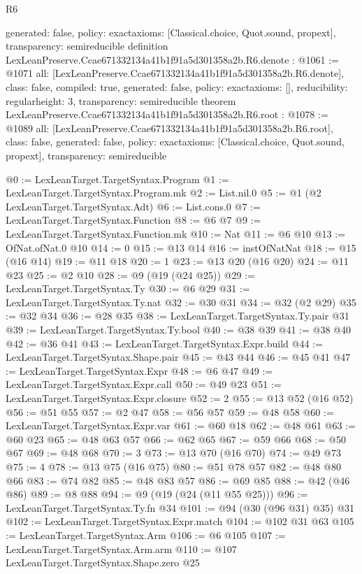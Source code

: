 \begin{lexlean}{R6}
\begin{coremodule}
{  generated: false,
  policy: exact{axioms: [Classical.choice, Quot.sound, propext]},
  transparency: semireducible
}
definition LexLeanPreserve.Ccae671332134a41b1f91a5d301358a2b.R6.denote : @1061 := @1071 {
  all: [LexLeanPreserve.Ccae671332134a41b1f91a5d301358a2b.R6.denote],
  class: false,
  compiled: true,
  generated: false,
  policy: exact{axioms: []},
  reducibility: regular{height: 3},
  transparency: semireducible
}
theorem LexLeanPreserve.Ccae671332134a41b1f91a5d301358a2b.R6.root : @1078 := @1089 {
  all: [LexLeanPreserve.Ccae671332134a41b1f91a5d301358a2b.R6.root],
  class: false,
  generated: false,
  policy: exact{axioms: [Classical.choice, Quot.sound, propext]},
  transparency: semireducible
}

@0 := LexLeanTarget.TargetSyntax.Program
@1 := LexLeanTarget.TargetSyntax.Program.mk
@2 := List.nil.{0}
@5 := @1 (@2 LexLeanTarget.TargetSyntax.Adt)
@6 := List.cons.{0}
@7 := LexLeanTarget.TargetSyntax.Function
@8 := @6 @7
@9 := LexLeanTarget.TargetSyntax.Function.mk
@10 := Nat
@11 := @6 @10
@13 := OfNat.ofNat.{0} @10
@14 := 0
@15 := @13 @14
@16 := instOfNatNat
@18 := @15 (@16 @14)
@19 := @11 @18
@20 := 1
@23 := @13 @20 (@16 @20)
@24 := @11 @23
@25 := @2 @10
@28 := @9 (@19 (@24 @25))
@29 := LexLeanTarget.TargetSyntax.Ty
@30 := @6 @29
@31 := LexLeanTarget.TargetSyntax.Ty.nat
@32 := @30 @31
@34 := @32 (@2 @29)
@35 := @32 @34
@36 := @28 @35
@38 := LexLeanTarget.TargetSyntax.Ty.pair @31
@39 := LexLeanTarget.TargetSyntax.Ty.bool
@40 := @38 @39
@41 := @38 @40
@42 := @36 @41
@43 := LexLeanTarget.TargetSyntax.Expr.build
@44 := LexLeanTarget.TargetSyntax.Shape.pair
@45 := @43 @44
@46 := @45 @41
@47 := LexLeanTarget.TargetSyntax.Expr
@48 := @6 @47
@49 := LexLeanTarget.TargetSyntax.Expr.call
@50 := @49 @23
@51 := LexLeanTarget.TargetSyntax.Expr.closure
@52 := 2
@55 := @13 @52 (@16 @52)
@56 := @51 @55
@57 := @2 @47
@58 := @56 @57
@59 := @48 @58
@60 := LexLeanTarget.TargetSyntax.Expr.var
@61 := @60 @18
@62 := @48 @61
@63 := @60 @23
@65 := @48 @63 @57
@66 := @62 @65
@67 := @59 @66
@68 := @50 @67
@69 := @48 @68
@70 := 3
@73 := @13 @70 (@16 @70)
@74 := @49 @73
@75 := 4
@78 := @13 @75 (@16 @75)
@80 := @51 @78 @57
@82 := @48 @80 @66
@83 := @74 @82
@85 := @48 @83 @57
@86 := @69 @85
@88 := @42 (@46 @86)
@89 := @8 @88
@94 := @9 (@19 (@24 (@11 @55 @25)))
@96 := LexLeanTarget.TargetSyntax.Ty.fn @34
@101 := @94 (@30 (@96 @31) @35) @31
@102 := LexLeanTarget.TargetSyntax.Expr.match
@104 := @102 @31 @63
@105 := LexLeanTarget.TargetSyntax.Arm
@106 := @6 @105
@107 := LexLeanTarget.TargetSyntax.Arm.arm
@110 := @107 LexLeanTarget.TargetSyntax.Shape.zero @25

\end{coremodule}
\end{lexlean}
